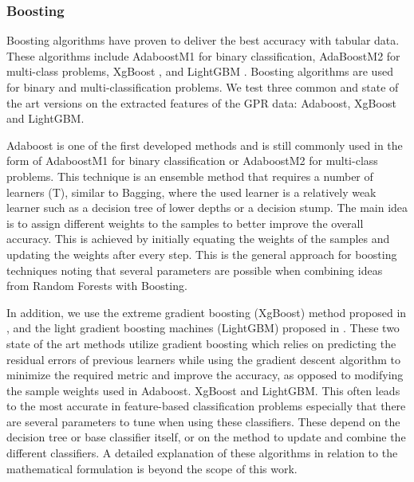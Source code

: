 \documentclass{ieeeaccess}
\begin{document}
\subsubsection*{Boosting}
Boosting algorithms have proven to deliver the best accuracy with tabular data. These algorithms include AdaboostM1 \cite{Freund1997} for binary classification, AdaBoostM2 \cite{Friedman2001} for multi-class problems, XgBoost \cite{Chen2016}, and LightGBM \cite{Ke2017}. Boosting algorithms are used for binary and multi-classification problems. We test three common and state of the art versions on the extracted features of the GPR data: Adaboost, XgBoost and LightGBM.

Adaboost is one of the first developed methods and is still commonly used in the form of AdaboostM1 for binary classification or AdaboostM2 for multi-class problems. This technique is an ensemble method that requires a number of learners (T), similar to Bagging, where the used learner is a relatively weak learner such as a decision tree of lower depths or a decision stump. The main idea is to assign different weights to the samples to better improve the overall accuracy. This is achieved by initially equating the weights of the samples and updating the weights after every step. This is the general approach for boosting techniques noting that several parameters are possible when combining ideas from Random Forests with Boosting.

In addition, we use the extreme gradient boosting (XgBoost) method proposed in \cite{Chen2016}, and the light gradient boosting machines (LightGBM) proposed in \cite{Ke2017}. These two state of the art methods utilize gradient boosting which relies on predicting the residual errors of previous learners while using the gradient descent algorithm to minimize the required metric and improve the accuracy, as opposed to modifying the sample weights used in Adaboost. XgBoost and LightGBM. This often leads to the most accurate in feature-based classification problems especially that there are several parameters to tune when using these classifiers. These depend on the decision tree or base classifier itself, or on the method to update and combine the different classifiers. A detailed explanation of these algorithms in relation to the mathematical formulation is beyond the scope of this work.
\end{document}
